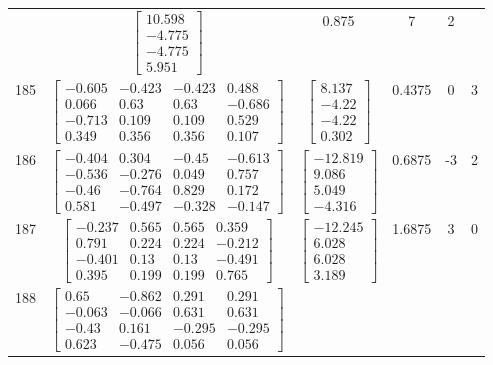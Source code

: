 \documentclass[a4paper,12pt]{article}
\begin{document}
\begin{tabular}{c c c c c c}
&
$\begin{bmatrix} 10.598 \\ -4.775 \\ -4.775 \\ 5.951 \end{bmatrix}$
&
0.875
&
7
&
2
\\
185
&
$\begin{bmatrix} -0.605 & -0.423 & -0.423 & 0.488 \\ 0.066 & 0.63 & 0.63 & -0.686 \\ -0.713 & 0.109 & 0.109 & 0.529 \\ 0.349 & 0.356 & 0.356 & 0.107 \end{bmatrix}$
&
$\begin{bmatrix} 8.137 \\ -4.22 \\ -4.22 \\ 0.302 \end{bmatrix}$
&
0.4375
&
0
&
3
\\
186
&
$\begin{bmatrix} -0.404 & 0.304 & -0.45 & -0.613 \\ -0.536 & -0.276 & 0.049 & 0.757 \\ -0.46 & -0.764 & 0.829 & 0.172 \\ 0.581 & -0.497 & -0.328 & -0.147 \end{bmatrix}$
&
$\begin{bmatrix} -12.819 \\ 9.086 \\ 5.049 \\ -4.316 \end{bmatrix}$
&
0.6875
&
-3
&
2
\\
187
&
$\begin{bmatrix} -0.237 & 0.565 & 0.565 & 0.359 \\ 0.791 & 0.224 & 0.224 & -0.212 \\ -0.401 & 0.13 & 0.13 & -0.491 \\ 0.395 & 0.199 & 0.199 & 0.765 \end{bmatrix}$
&
$\begin{bmatrix} -12.245 \\ 6.028 \\ 6.028 \\ 3.189 \end{bmatrix}$
&
1.6875
&
3
&
0
\\
188
&
$\begin{bmatrix} 0.65 & -0.862 & 0.291 & 0.291 \\ -0.063 & -0.066 & 0.631 & 0.631 \\ -0.43 & 0.161 & -0.295 & -0.295 \\ 0.623 & -0.475 & 0.056 & 0.056 \end{bmatrix}$

\end{tabular}
\end{document}

